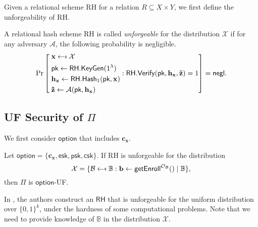 Given a relational scheme \textsf{RH} for a relation $R \subseteq X \times Y$, we first define the unforgeability \cite{cryptoeprint:2014/394} of \textsf{RH}.

\begin{definition}[Unforgeability]

A relational hash scheme \textsf{RH} is called \emph{unforgeable} for the distribution $\mathcal{X}$ if for any adversary $\mathcal{A}$, the following probability is negligible.
\[
	\Pr \left [
		\begin{aligned} 
			 &\; \mathbf{x} \getsdollar \mathcal{X} \\
			 &\; \textsf{pk} \gets \textsf{RH.KeyGen}(1^\lambda) \\
			 &\; \mathbf{h_x} \gets \textsf{RH.Hash}_1(\textsf{pk}, \mathbf{x}) \\
			 &\; \mathbf{\tilde{z}} \gets \mathcal{A}(\textsf{pk}, \mathbf{h_x})
		\end{aligned} :
		\textsf{RH.Verify}(\textsf{pk}, \mathbf{h_x}, \mathbf{\tilde{z}}) = 1
		\right ] = \negl.
\]

\end{definition}



\subsection{UF Security of $\Pi$}
\label{sec:security_analysis:rh:uf}

We first consider $\textsf{option}$ that includes $\mathbf{c_x}$.


\begin{theorem}
\label{thm:rh:uf-uf-cx}

Let $\textsf{option} = \{\mathbf{c_x}, \textsf{esk}, \textsf{psk}, \textsf{csk}\}$. If \textsf{RH} is unforgeable for the distribution
\[
	\mathcal{X} = \{ \mathcal{B} \getsdollar \mathbb{B}: \mathbf{b} \gets {\sf getEnroll}^{\mathcal{O}_\mathcal{B}}() \mid \mathbb{B} \},
\]
then $\Pi$ is $\textsf{option}$-UF. 

\end{theorem}

In \cite{cryptoeprint:2014/394}, the authors construct an $\textsf{RH}$ that is unforgeable for the uniform distribution over $\{0, 1\}^k$, under the hardness of some computational problems. Note that we need to provide knowledge of $\mathbb{B}$ in the distribution $\mathcal{X}$.

